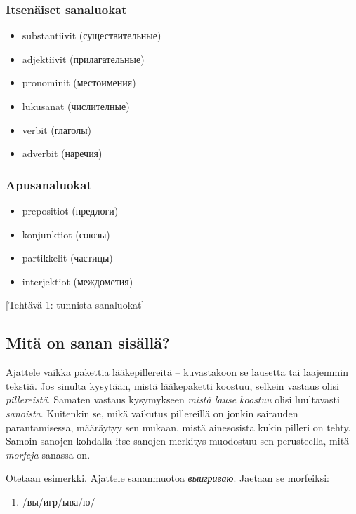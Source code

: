 \documentclass[]{scrartcl}
\providecommand{\tightlist}{%
  \setlength{\itemsep}{0pt}\setlength{\parskip}{0pt}}
\begin{document}
\subsubsection{Itsenäiset sanaluokat}\label{itsenuxe4iset-sanaluokat}

\begin{itemize}
\tightlist
\item
  substantiivit (существительные)
\item
  adjektiivit (прилагательные)
\item
  pronominit (местоимения)
\item
  lukusanat (числителные)
\item
  verbit (глаголы)
\item
  adverbit (наречия)
\end{itemize}

\subsubsection{Apusanaluokat}\label{apusanaluokat}

\begin{itemize}
\tightlist
\item
  prepositiot (предлоги)
\item
  konjunktiot (союзы)
\item
  partikkelit (частицы)
\item
  interjektiot (междометия)
\end{itemize}

{[}Tehtävä 1: tunnista sanaluokat{]}

\subsection{Mitä on sanan
sisällä?}\label{mituxe4-on-sanan-sisuxe4lluxe4}

Ajattele vaikka pakettia lääkepillereitä -- kuvastakoon se lausetta tai
laajemmin tekstiä. Jos sinulta kysytään, mistä lääkepaketti koostuu,
selkein vastaus olisi \emph{pillereistä}. Samaten vastaus kysymykseen
\emph{mistä lause koostuu} olisi luultavasti \emph{sanoista}. Kuitenkin
se, mikä vaikutus pillereillä on jonkin sairauden parantamisessa,
määräytyy sen mukaan, mistä ainesosista kukin pilleri on tehty. Samoin
sanojen kohdalla itse sanojen merkitys muodostuu sen perusteella, mitä
\emph{morfeja} sanassa on.

Otetaan esimerkki. Ajattele sananmuotoa \emph{выигриваю}. Jaetaan se
morfeiksi:

\begin{enumerate}
\def\labelenumi{(\arabic{enumi})}
\tightlist
\item
  /вы/игр/ыва/ю/
\end{enumerate}
\end{document}
